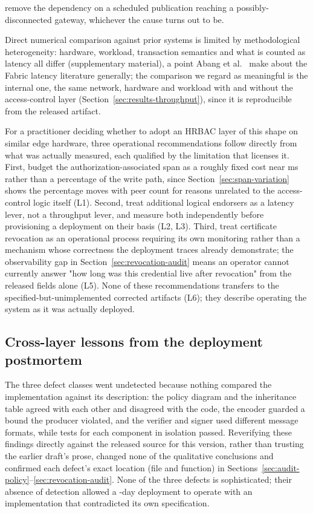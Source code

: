 remove the dependency on a scheduled publication reaching a possibly-disconnected gateway, whichever the cause turns out to be.

Direct numerical comparison against prior systems is limited by methodological heterogeneity: hardware, workload, transaction semantics and what is counted as latency all differ (supplementary material), a point Abang et al.\ \citep{abang2024latency} make about the Fabric latency literature generally; the comparison we regard as meaningful is the internal one, the same network, hardware and workload with and without the access-control layer (Section~\ref{sec:results-throughput}), since it is reproducible from the released artifact.

For a practitioner deciding whether to adopt an HRBAC layer of this shape on similar edge hardware, three operational recommendations follow directly from what was actually measured, each qualified by the limitation that licenses it. First, budget the authorization-associated span as a roughly fixed cost near \SpanLatencyPeerFour{} ms rather than a percentage of the write path, since Section~\ref{sec:span-variation} shows the percentage moves with peer count for reasons unrelated to the access-control logic itself (L1). Second, treat additional logical endorsers as a latency lever, not a throughput lever, and measure both independently before provisioning a deployment on their basis (L2, L3). Third, treat certificate revocation as an operational process requiring its own monitoring rather than a mechanism whose correctness the deployment traces already demonstrate; the observability gap in Section~\ref{sec:revocation-audit} means an operator cannot currently answer "how long was this credential live after revocation" from the released fields alone (L5). None of these recommendations transfers to the specified-but-unimplemented corrected artifacts (L6); they describe operating the system as it was actually deployed.

\subsection{Cross-layer lessons from the deployment postmortem}

The three defect classes went undetected because nothing compared the implementation against its description: the policy diagram and the inheritance table agreed with each other and disagreed with the code, the encoder guarded a bound the producer violated, and the verifier and signer used different message formats, while tests for each component in isolation passed. Reverifying these findings directly against the released source for this version, rather than trusting the earlier draft's prose, changed none of the qualitative conclusions and confirmed each defect's exact location (file and function) in Sections~\ref{sec:audit-policy}--\ref{sec:revocation-audit}. None of the three defects is sophisticated; their absence of detection allowed a \DeploymentDays{}-day deployment to operate with an implementation that contradicted its own specification.

